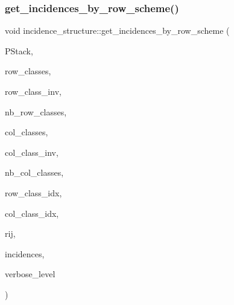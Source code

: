 \mbox{\label{classincidence__structure_addab249e03244133841bd793389c792c}} 
\subsubsection{\texorpdfstring{get\+\_\+incidences\+\_\+by\+\_\+row\+\_\+scheme()}{get\_incidences\_by\_row\_scheme()}}
{\footnotesize\ttfamily void incidence\+\_\+structure\+::get\+\_\+incidences\+\_\+by\+\_\+row\+\_\+scheme (\begin{DoxyParamCaption}\item[{\mbox{\hyperlink{classpartitionstack}{partitionstack}} \&}]{P\+Stack,  }\item[{\mbox{\hyperlink{galois_8h_a09fddde158a3a20bd2dcadb609de11dc}{I\+NT}} $\ast$}]{row\+\_\+classes,  }\item[{\mbox{\hyperlink{galois_8h_a09fddde158a3a20bd2dcadb609de11dc}{I\+NT}} $\ast$}]{row\+\_\+class\+\_\+inv,  }\item[{\mbox{\hyperlink{galois_8h_a09fddde158a3a20bd2dcadb609de11dc}{I\+NT}}}]{nb\+\_\+row\+\_\+classes,  }\item[{\mbox{\hyperlink{galois_8h_a09fddde158a3a20bd2dcadb609de11dc}{I\+NT}} $\ast$}]{col\+\_\+classes,  }\item[{\mbox{\hyperlink{galois_8h_a09fddde158a3a20bd2dcadb609de11dc}{I\+NT}} $\ast$}]{col\+\_\+class\+\_\+inv,  }\item[{\mbox{\hyperlink{galois_8h_a09fddde158a3a20bd2dcadb609de11dc}{I\+NT}}}]{nb\+\_\+col\+\_\+classes,  }\item[{\mbox{\hyperlink{galois_8h_a09fddde158a3a20bd2dcadb609de11dc}{I\+NT}}}]{row\+\_\+class\+\_\+idx,  }\item[{\mbox{\hyperlink{galois_8h_a09fddde158a3a20bd2dcadb609de11dc}{I\+NT}}}]{col\+\_\+class\+\_\+idx,  }\item[{\mbox{\hyperlink{galois_8h_a09fddde158a3a20bd2dcadb609de11dc}{I\+NT}}}]{rij,  }\item[{\mbox{\hyperlink{galois_8h_a09fddde158a3a20bd2dcadb609de11dc}{I\+NT}} $\ast$\&}]{incidences,  }\item[{\mbox{\hyperlink{galois_8h_a09fddde158a3a20bd2dcadb609de11dc}{I\+NT}}}]{verbose\+\_\+level }\end{DoxyParamCaption})}

